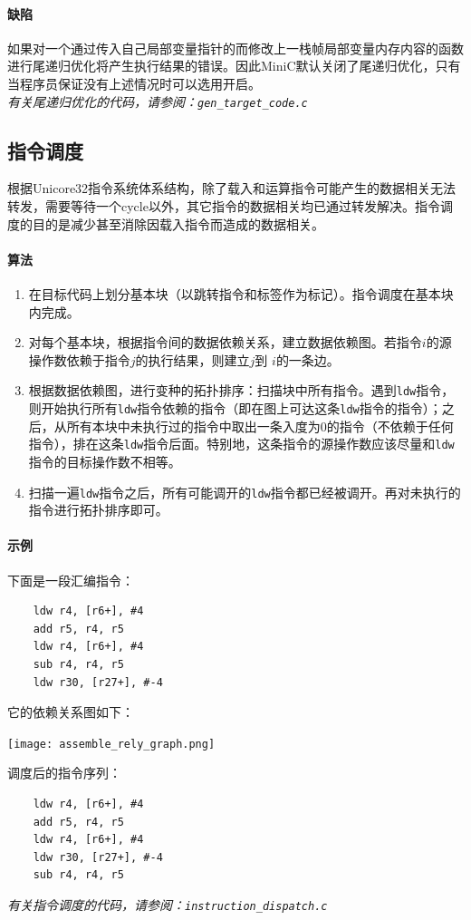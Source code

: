 \paragraph*{缺陷}
如果对一个通过传入自己局部变量指针的而修改上一栈帧局部变量内存内容的函数进行尾递归优化将产生执行结果的错误。因此MiniC默认关闭了尾递归优化，只有当程序员保证没有上述情况时可以选用开启。\\
{\it \anchor 有关尾递归优化的代码，请参阅：\verb|gen_target_code.c|}\\

\subsection{指令调度}
\label{assembledispatch}
根据Unicore32指令系统体系结构，除了载入和运算指令可能产生的数据相关无法转发，需要等待一个cycle以外，其它指令的数据相关均已通过转发解决。指令调度的目的是减少甚至消除因载入指令而造成的数据相关。

\paragraph*{算法}
\begin{enumerate}
	\item 在目标代码上划分基本块（以跳转指令和标签作为标记）。指令调度在基本块内完成。
	\item 对每个基本块，根据指令间的数据依赖关系，建立数据依赖图。若指令$i$的源操作数依赖于指令$j$的执行结果，则建立$j$到
$i$的一条边。
	\item 根据数据依赖图，进行变种的拓扑排序：扫描块中所有指令。遇到\verb|ldw|指令，则开始执行所有\verb|ldw|指令依赖的指令（即在图上可达这条\verb|ldw|指令的指令）；之后，从所有本块中未执行过的指令中取出一条入度为0的指令（不依赖于任何指令），排在这条\verb|ldw|指令后面。特别地，这条指令的源操作数应该尽量和\verb|ldw|指令的目标操作数不相等。
	\item 扫描一遍\verb|ldw|指令之后，所有可能调开的\verb|ldw|指令都已经被调开。再对未执行的指令进行拓扑排序即可。
\end{enumerate}
\paragraph*{示例}
下面是一段汇编指令：
\begin{verbatim}
	ldw	r4, [r6+], #4
	add	r5, r4, r5
	ldw	r4, [r6+], #4
	sub	r4, r4, r5
	ldw	r30, [r27+], #-4
\end{verbatim}
它的依赖关系图如下：
\begin{center}
	\texttt{[image: assemble\_rely\_graph.png]}
\end{center}
调度后的指令序列：
\begin{verbatim}
	ldw	r4, [r6+], #4
	add	r5, r4, r5
	ldw	r4, [r6+], #4
	ldw	r30, [r27+], #-4
	sub	r4, r4, r5
\end{verbatim}
{\it \anchor 有关指令调度的代码，请参阅：\verb|instruction_dispatch.c|}\\

